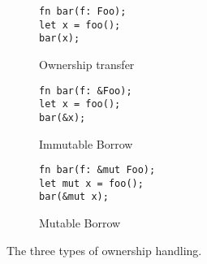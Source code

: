 \begin{figure}[ht]
  \begin{subfigure}{0.3\textwidth}
\caption{Ownership transfer}
    \begin{lstlisting}
fn bar(f: Foo);
let x = foo();
bar(x);\end{lstlisting}
  \end{subfigure}%
  \hfill
  \begin{subfigure}{0.3\textwidth}
\caption{Immutable Borrow}
    \begin{lstlisting}
fn bar(f: &Foo);
let x = foo();
bar(&x);\end{lstlisting}
  \end{subfigure}%
  \hfill
  \begin{subfigure}{0.3\textwidth}
\caption{Mutable Borrow}
    \begin{lstlisting}
fn bar(f: &mut Foo);
let mut x = foo();
bar(&mut x);\end{lstlisting}
  \end{subfigure}%
  \caption{The three types of ownership handling.\label{fig:rust-ownership}}
\end{figure}
